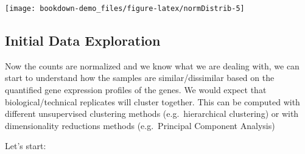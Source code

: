 \documentclass[]{book}
\begin{document}
\begin{center}\texttt{[image: bookdown-demo\_files/figure-latex/normDistrib-5]} \end{center}

\hypertarget{initial-data-exploration}{%
\subsection{Initial Data Exploration}\label{initial-data-exploration}}

Now the counts are normalized and we know what we are dealing with, we can start to understand how the samples are similar/dissimilar based on the quantified gene expression profiles of the genes.
We would expect that biological/technical replicates will cluster together.
This can be computed with different unsupervised clustering methods (e.g.~hierarchical clustering) or with dimensionality reductions methods (e.g.~Principal Component Analysis)

Let's start:
\end{document}

